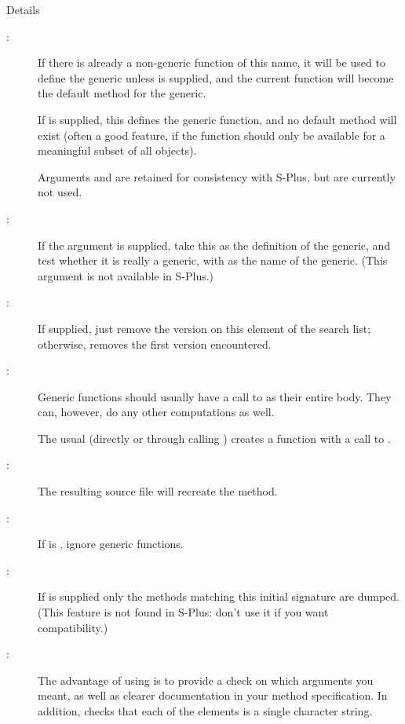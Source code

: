 \begin{Section}{Details}
\begin{description}

\item[:] 
If there is already a non-generic function of this name, it will
be used to define the generic unless  is supplied, and
the current function will become the default method for the
generic.

If  is supplied, this defines the generic function, and
no default method will exist (often a good feature, if the
function should only be available for a meaningful subset of all
objects).

Arguments  and  are retained for
consistency with S-Plus, but are currently not used.

\item[:] 
If the  argument is supplied, take this as the
definition of the generic, and test whether it is really a
generic, with  as the name of the generic.  (This argument
is not available in S-Plus.)

\item[:] 
If  supplied, just remove the version on this element
of the search list; otherwise, removes the first version
encountered.

\item[:] 
Generic functions should usually have a call to
 as their entire body.  They can, however,
do any other computations as well.

The usual  (directly or through calling
) creates a function with a call to
.

\item[:] 
The resulting source file will recreate the method.

\item[:] 
If  is , ignore generic functions.

\item[:] 
If  is supplied only the methods matching this
initial signature are dumped.  (This feature is not found in
S-Plus:  don't use it if you want compatibility.)

\item[:] 
The advantage of using  is to provide a check on
which arguments you meant, as well as clearer documentation in
your method specification.  In addition,  checks
that each of the elements is a single character string.


\end{description}
\end{Section}
